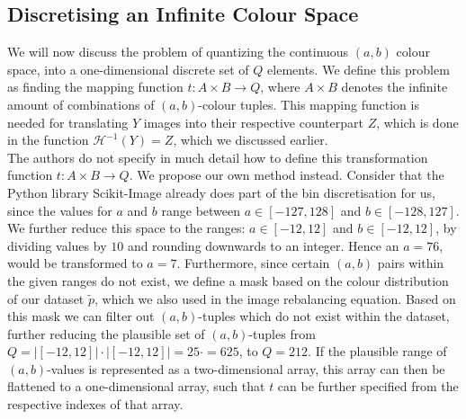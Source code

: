 \documentclass{article}
\begin{document}
\subsection{Discretising an Infinite Colour Space}
We will now discuss the problem of quantizing the continuous $(a, b)$ colour space, into a one-dimensional discrete set of $Q$ elements. We define this problem as finding the mapping function $t:A\times B\rightarrow Q$, where $A\times B$ denotes the infinite amount of combinations of $(a, b)$-colour tuples. This mapping function is needed for translating $Y$ images into their respective counterpart $Z$, which is done in the function $\mathcal{H}^{-1}\left(Y\right)=Z$, which we discussed earlier.\\
The authors do not specify in much detail how to define this transformation function $t:A\times B\rightarrow Q$. We propose our own method instead. Consider that the Python library Scikit-Image already does part of the bin discretisation for us, since the values for $a$ and $b$ range between $a\in\left[-127,128\right]$ and $b\in\left[-128, 127\right]$. We further reduce this space to the ranges: $a\in\left[-12,12\right]$ and  $b\in\left[-12,12\right]$, by dividing values by $10$ and rounding downwards to an integer. Hence an $a=76$, would be transformed to $a=7$. Furthermore, since certain $(a, b)$ pairs within the given ranges do not exist, we define a mask based on the colour distribution of our dataset $\widetilde{p}$, which we also used in the image rebalancing equation. Based on this mask we can filter out $(a, b)$-tuples which do not exist within the dataset, further reducing the plausible set of $(a, b)$-tuples from $Q=\left|\left[-12,12\right]\right|\cdot\left|\left[-12,12\right]\right|=25\cdot=625$, to $Q=212$. If the plausible range of $(a,b)$-values is represented as a two-dimensional array, this array can then be flattened to a one-dimensional array, such that $t$ can be further specified from the respective indexes of that array.
\end{document}

